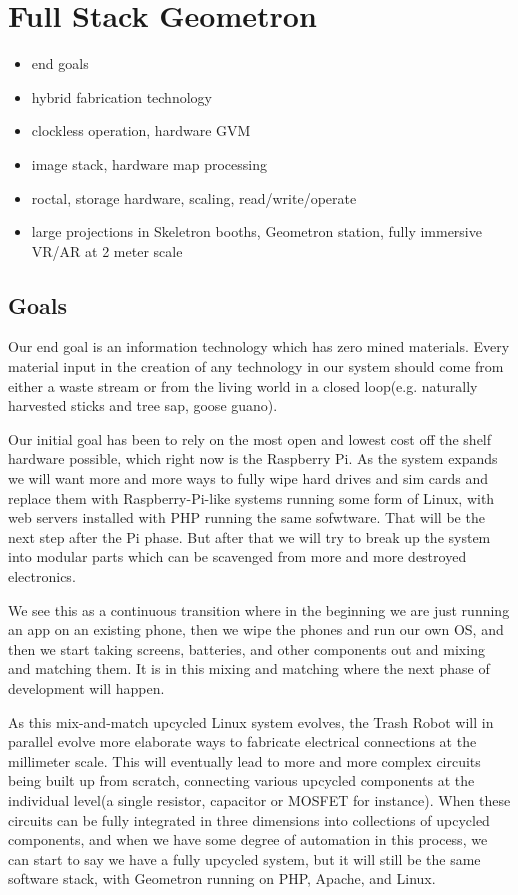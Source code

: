\section{Full Stack Geometron}
\begin{itemize}
\tightlist
\item
end goals
\item
hybrid fabrication technology
\item
clockless operation, hardware GVM
\item
image stack, hardware map processing
\item
roctal, storage hardware, scaling, read/write/operate
\item
large projections in Skeletron booths, Geometron station, fully immersive VR/AR at 2 meter scale
\end{itemize}

\subsection{Goals}

Our end goal is an information technology which has zero mined materials.  Every material input in the creation of any technology in our system should come from either a waste stream or from the living world in a closed loop(e.g. naturally harvested sticks and tree sap, goose guano). 

Our initial goal has been to rely on the most open and lowest cost off the shelf hardware possible, which right now is the Raspberry Pi.  As the system expands we will want more and more ways to fully wipe hard drives and sim cards and replace them with Raspberry-Pi-like systems running some form of Linux, with web servers installed with PHP running the same sofwtware. That will be the next step after the Pi phase.  But after that we will try to break up the system into modular parts which can be scavenged from more and more destroyed electronics.  

We see this as a continuous transition where in the beginning we are just running an app on an existing phone, then we wipe the phones and run our own OS, and then we start taking screens, batteries, and other components out and mixing and matching them.  It is in this mixing and matching where the next phase of development will happen.

As this mix-and-match upcycled Linux system evolves, the Trash Robot will in parallel evolve more elaborate ways to fabricate electrical connections at the millimeter scale.  This will eventually lead to more and more complex circuits being built up from scratch, connecting various upcycled components at the individual level(a single resistor, capacitor or MOSFET for instance).  When these circuits can be fully integrated in three dimensions into collections of upcycled components, and when we have some degree of automation in this process, we can start to say we have a fully upcycled system, but it will still be the same software stack, with Geometron running on PHP, Apache, and Linux.  

